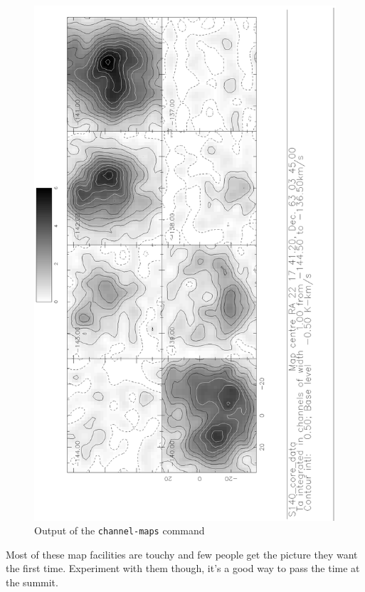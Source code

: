 \documentclass[11pt,twoside]{article}
\begin{document}
\begin{figure}[htb]
\centering
\includegraphics[angle=-90,width=5in]{sc8_chann.ps}
\vspace*{-0.5cm}
\begin{center}
\begin{minipage}[t]{5in}
\caption[Velocity slices]
{\small{Output of the {\tt channel-maps} command}
}
\label{fig:specx_chann_maps}
\end{minipage}
\end{center}
\end{figure}

Most of these map facilities are touchy and few people get the picture
they want the first time.  Experiment with them though, it's a good
way to pass the time at the summit.
\end{document}
